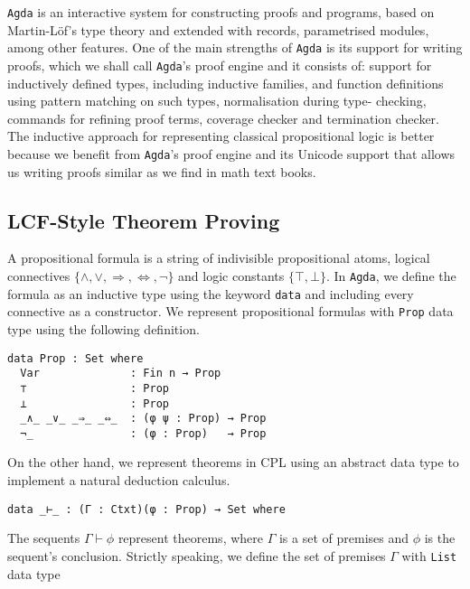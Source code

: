 \documentclass[../main.tex]{subfiles}
\begin{document}
\verb!Agda! is an interactive system for constructing proofs and programs,
based on Martin-L\"{o}f's type theory and extended with records, parametrised
modules, among other features.
One of the main strengths of \verb!Agda! is its support for writing proofs,
which we shall call \verb!Agda!'s proof engine and it consists of: support for
inductively defined types, including inductive families, and function
definitions using pattern matching on such types, normalisation during type-
checking, commands for refining proof terms, coverage checker and termination
checker.
The inductive approach for representing classical propositional logic
is better because we benefit from \verb!Agda!'s proof engine and its Unicode
support that allows us writing proofs similar as we find in math text books.


\subsection{LCF-Style Theorem Proving}
\label{ssec:lcf-style-theormem-proving}

A propositional formula is a string of indivisible propositional atoms,
logical connectives $\{\wedge, \vee, \Rightarrow, \Leftrightarrow, \neg\}$
and logic constants $\{\top, \bot\}$.
In \verb!Agda!, we define the formula
as an inductive type using the keyword \texttt{data} and including every
connective as a constructor. We represent propositional formulas with
\verb!Prop! data type using the following definition.


\begin{verbatim}
data Prop : Set where
  Var              : Fin n → Prop
  ⊤                : Prop
  ⊥                : Prop
  _∧_ _∨_ _⇒_ _⇔_  : (φ ψ : Prop) → Prop
  ¬_               : (φ : Prop)   → Prop
\end{verbatim}

On the other hand, we represent theorems in CPL using an abstract data type
to implement a natural deduction calculus.

\begin{verbatim}
data _⊢_ : (Γ : Ctxt)(φ : Prop) → Set where
\end{verbatim}

The sequents  $\Gamma \vdash \phi$ represent theorems,
where $\Gamma$ is a set of premises and $\phi$ is the
sequent's conclusion. Strictly speaking, we define the set of premises
$\Gamma$ with \verb!List! data type
\end{document}
